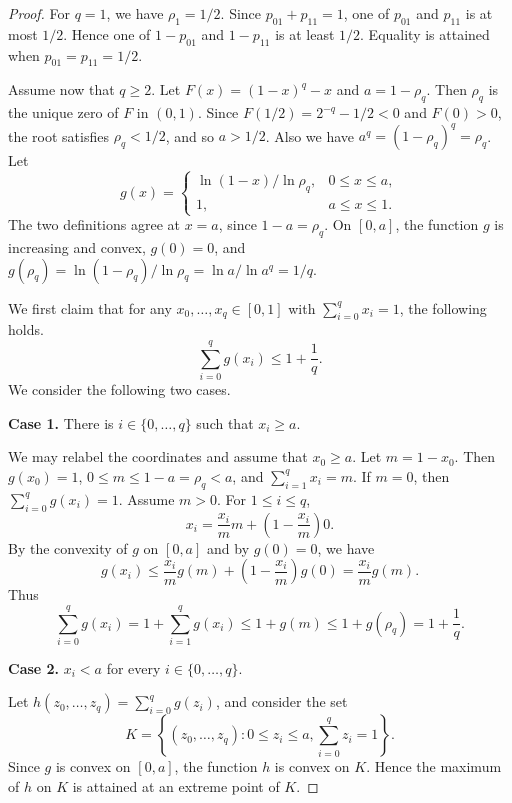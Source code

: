 \documentclass[12pt]{article}
\numberwithin{equation}{section}
\theoremstyle{definition}
\begin{document}
\begin{proof}
For $q = 1$, we have $\rho_1 = 1/2$. Since $p_{01} + p_{11} = 1$, one of
$p_{01}$ and $p_{11}$ is at most $1/2$. Hence one of $1 - p_{01}$ and
$1 - p_{11}$ is at least $1/2$. Equality is attained when
$p_{01} = p_{11} = 1/2$.

Assume now that $q \geq 2$. Let $F(x)=(1-x)^q-x$ and
$a=1-\rho_q$. Then $\rho_q$ is the unique zero of $F$ in $(0,1)$. Since
$F(1/2) = 2^{-q} - 1/2 < 0$ and $F(0) > 0$, the root satisfies $\rho_q < 1/2$, and
so $a > 1/2$. Also we have $a^q = (1 - \rho_q)^q = \rho_q$. Let
\[
 g(x) =
 \begin{cases}
  \ln(1 - x)/\ln\rho_q, & 0 \leq x \leq a,\\
  1, & a \leq x \leq 1.
 \end{cases}
\]
The two definitions agree at $x = a$, since $1 - a = \rho_q$. On $[0,a]$, the
function $g$ is increasing and convex, $g(0) = 0$, and
$g(\rho_q) = \ln(1 - \rho_q)/\ln\rho_q = \ln a/\ln a^q = 1/q$.

We first claim that for any $x_0,\ldots,x_q \in [0,1]$ with
$\sum_{i = 0}^q x_i = 1$, the following holds.
\begin{equation}\label{eq:column-bound}
        \sum_{i = 0}^q g(x_i) \leq 1 + \frac{1}{q}.
\end{equation}
We consider the following two cases.

\medskip
\noindent
\textbf{Case 1.} There is $i \in \{0,\ldots,q\}$ such that $x_i \geq a$.
\medskip

We may relabel the coordinates and assume that $x_0 \geq a$. Let
$m = 1 - x_0$. Then
$g(x_0) = 1$, $0 \leq m \leq 1 - a = \rho_q < a$, and
$\sum_{i = 1}^q x_i = m$. If $m = 0$,
then $\sum_{i = 0}^q g(x_i) = 1$. Assume $m > 0$. For
$1 \leq i \leq q$,
\[
        x_i = \frac{x_i}{m}m + \left(1 - \frac{x_i}{m}\right)0.
\]
By the convexity of $g$ on $[0,a]$ and by $g(0) = 0$, we have
\[
        g(x_i) \leq
        \frac{x_i}{m}g(m) + \left(1 - \frac{x_i}{m}\right)g(0)
 = \frac{x_i}{m}g(m).
\]
Thus
\[
        \sum_{i = 0}^q g(x_i)
 = 1 + \sum_{i = 1}^q g(x_i)
 \leq 1 + g(m)
 \leq 1 + g(\rho_q)
 = 1 + \frac{1}{q}.
\]

\medskip
\noindent
\textbf{Case 2.} $x_i < a$ for every $i \in \{0,\ldots,q\}$.
\medskip

Let $h(z_0,\ldots,z_q) = \sum_{i = 0}^q g(z_i)$, and consider the set
\[
K = \left\{(z_0,\ldots,z_q) : 0 \leq z_i \leq a,
      \sum_{i = 0}^q z_i = 1\right\}.
\]
Since $g$ is convex on $[0,a]$,
the function $h$ is convex on $K$. Hence the maximum of $h$ on $K$ is attained
at an extreme point of $K$.


\end{proof}
\end{document}
